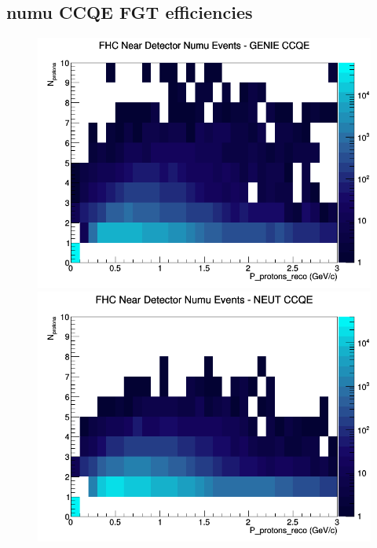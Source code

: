 \subsection{numu CCQE FGT efficiencies}
\begin{figure}[h]
\includegraphics[width=\linewidth]{eff_N_P/FGT/protons/CCQE_FHC_ND_numu_N_P_GENIE.png}
\endminipage
{}
\includegraphics[width=\linewidth]{eff_N_P/FGT/protons/CCQE_FHC_ND_numu_N_P_NEUT.png}
\endminipage
{}

\end{figure}
